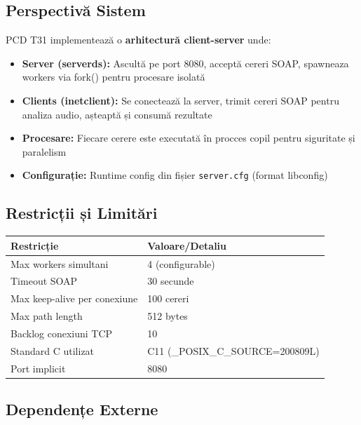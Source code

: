 \documentclass[12pt,a4paper,twoside]{article}
\begin{document}
\subsection{Perspectivă Sistem}

PCD T31 implementează o \textbf{arhitectură client-server} unde:

\begin{itemize}
    \item \textbf{Server (serverds):} Ascultă pe port 8080, acceptă cereri SOAP,
          spawneaza workers via fork() pentru procesare isolată
    \item \textbf{Clients (inetclient):} Se conectează la server, trimit cereri SOAP
          pentru analiza audio, așteaptă și consumă rezultate
    \item \textbf{Procesare:} Fiecare cerere este executată în procces copil pentru
          siguritate și paralelism
    \item \textbf{Configurație:} Runtime config din fișier \texttt{server.cfg} 
          (format libconfig)
\end{itemize}

\subsection{Restricții și Limitări}

\begin{table}[H]
    \centering
    \begin{tabular}{|l|l|}
        \toprule
        \textbf{Restricție} & \textbf{Valoare/Detaliu} \\
        \midrule
        Max workers simultani & 4 (configurable) \\
        Timeout SOAP & 30 secunde \\
        Max keep-alive per conexiune & 100 cereri \\
        Max path length & 512 bytes \\
        Backlog conexiuni TCP & 10 \\
        Standard C utilizat & C11 (\_POSIX\_C\_SOURCE=200809L) \\
        Port implicit & 8080 \\
        \bottomrule
    \end{tabular}
\end{table}

\subsection{Dependențe Externe}
\end{document}
